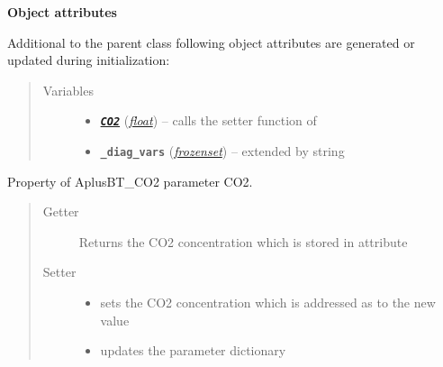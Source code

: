 \documentclass[letterpaper,10pt,english]{sphinxmanual}
\begin{document}
\begin{fulllineitems}
\begin{quote}
\begin{description}
\begin{itemize}
\end{itemize}


\end{description}\end{quote}

\textbf{Object attributes}

Additional to the parent class {\hyperref[api/climlab.process:climlab.process.energy_budget.EnergyBudget]{\emph{}}}
following object attributes are generated or updated during initialization:
\begin{quote}\begin{description}
\item[{Variables}] \leavevmode\begin{itemize}
\item {} 
{\hyperref[api/climlab.radiation:climlab.radiation.AplusBT.AplusBT_CO2.CO2]{\emph{\textbf{\texttt{CO2}}}}} (\href{http://docs.python.org/2.7/library/functions.html\#float}{\emph{float}}) -- calls the setter function of {\hyperref[api/climlab.radiation:climlab.radiation.AplusBT.AplusBT_CO2.CO2]{\emph{}}}

\item {} 
\textbf{\texttt{\_diag\_vars}} (\href{http://docs.python.org/2.7/library/stdtypes.html\#frozenset}{\emph{frozenset}}) -- extended by string 

\end{itemize}

\end{description}\end{quote}

\begin{fulllineitems}
\label{api/climlab.radiation:climlab.radiation.AplusBT.AplusBT_CO2.CO2}
Property of AplusBT\_CO2 parameter CO2.
\begin{quote}\begin{description}
\item[{Getter}] \leavevmode
Returns the CO2 concentration which is stored in attribute 

\item[{Setter}] \leavevmode\begin{itemize}
\item {} 
sets the CO2 concentration which is addressed as 
to the new value

\item {} 
updates the parameter dictionary 


\end{itemize}
\end{description}
\end{quote}
\end{fulllineitems}
\end{fulllineitems}
\end{document}
